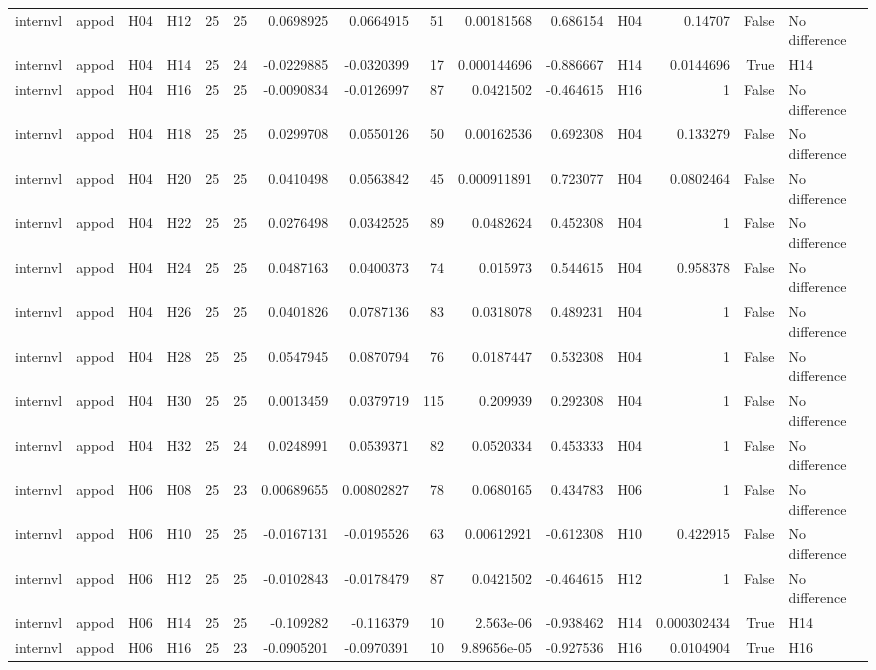 \begin{longtable}{llllrrrrrrrlrrl}
internvl & appod & H04 & H12 & 25 & 25 & 0.0698925 & 0.0664915 & 51 & 0.00181568 & 0.686154 & H04 & 0.14707 & False & No difference \\
internvl & appod & H04 & H14 & 25 & 24 & -0.0229885 & -0.0320399 & 17 & 0.000144696 & -0.886667 & H14 & 0.0144696 & True & H14 \\
internvl & appod & H04 & H16 & 25 & 25 & -0.0090834 & -0.0126997 & 87 & 0.0421502 & -0.464615 & H16 & 1 & False & No difference \\
internvl & appod & H04 & H18 & 25 & 25 & 0.0299708 & 0.0550126 & 50 & 0.00162536 & 0.692308 & H04 & 0.133279 & False & No difference \\
internvl & appod & H04 & H20 & 25 & 25 & 0.0410498 & 0.0563842 & 45 & 0.000911891 & 0.723077 & H04 & 0.0802464 & False & No difference \\
internvl & appod & H04 & H22 & 25 & 25 & 0.0276498 & 0.0342525 & 89 & 0.0482624 & 0.452308 & H04 & 1 & False & No difference \\
internvl & appod & H04 & H24 & 25 & 25 & 0.0487163 & 0.0400373 & 74 & 0.015973 & 0.544615 & H04 & 0.958378 & False & No difference \\
internvl & appod & H04 & H26 & 25 & 25 & 0.0401826 & 0.0787136 & 83 & 0.0318078 & 0.489231 & H04 & 1 & False & No difference \\
internvl & appod & H04 & H28 & 25 & 25 & 0.0547945 & 0.0870794 & 76 & 0.0187447 & 0.532308 & H04 & 1 & False & No difference \\
internvl & appod & H04 & H30 & 25 & 25 & 0.0013459 & 0.0379719 & 115 & 0.209939 & 0.292308 & H04 & 1 & False & No difference \\
internvl & appod & H04 & H32 & 25 & 24 & 0.0248991 & 0.0539371 & 82 & 0.0520334 & 0.453333 & H04 & 1 & False & No difference \\
internvl & appod & H06 & H08 & 25 & 23 & 0.00689655 & 0.00802827 & 78 & 0.0680165 & 0.434783 & H06 & 1 & False & No difference \\
internvl & appod & H06 & H10 & 25 & 25 & -0.0167131 & -0.0195526 & 63 & 0.00612921 & -0.612308 & H10 & 0.422915 & False & No difference \\
internvl & appod & H06 & H12 & 25 & 25 & -0.0102843 & -0.0178479 & 87 & 0.0421502 & -0.464615 & H12 & 1 & False & No difference \\
internvl & appod & H06 & H14 & 25 & 25 & -0.109282 & -0.116379 & 10 & 2.563e-06 & -0.938462 & H14 & 0.000302434 & True & H14 \\
internvl & appod & H06 & H16 & 25 & 23 & -0.0905201 & -0.0970391 & 10 & 9.89656e-05 & -0.927536 & H16 & 0.0104904 & True & H16 \\

\end{longtable}
